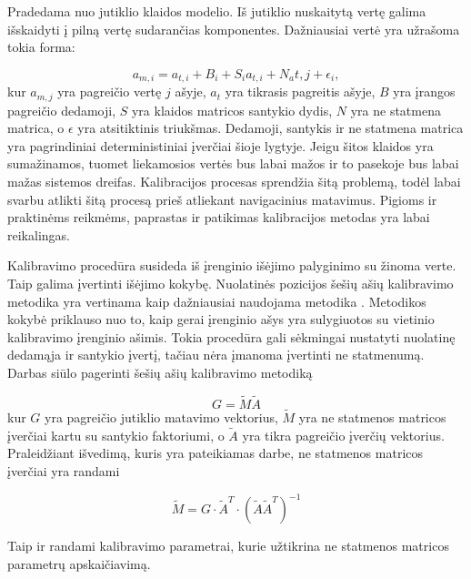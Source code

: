 Pradedama nuo jutiklio klaidos modelio. Iš jutiklio nuskaitytą vertę galima išskaidyti į pilną vertę sudarančias komponentes. Dažniausiai vertė yra užrašoma tokia forma:

\begin{equation}
    a_{m,i} = a_{t,i} + B_i + S_{i}a_{t,i} + N_a{t,j} + \epsilon_i,
\end{equation}
kur $a_{m,j}$ yra pagreičio vertę $j$ ašyje, $a_t$ yra tikrasis pagreitis ašyje, $B$ yra įrangos pagreičio dedamoji, $S$ yra klaidos matricos santykio dydis, $N$ yra ne statmena matrica, o $\epsilon$ yra atsitiktinis triukšmas. Dedamoji, santykis ir ne statmena matrica yra pagrindiniai deterministiniai įverčiai šioje lygtyje. Jeigu šitos klaidos yra sumažinamos, tuomet liekamosios vertės bus labai mažos ir to pasekoje bus labai mažas sistemos dreifas. Kalibracijos procesas sprendžia šitą problemą, todėl labai svarbu atlikti šitą procesą prieš atliekant navigacinius matavimus. Pigioms ir praktinėms reikmėms, paprastas ir patikimas kalibracijos metodas yra labai reikalingas.

Kalibravimo procedūra susideda iš įrenginio išėjimo palyginimo su žinoma verte. Taip galima įvertinti išėjimo kokybę. Nuolatinės pozicijos šešių ašių kalibravimo metodika yra vertinama kaip dažniausiai naudojama metodika \cite{syed2007new}. Metodikos kokybė priklauso nuo to, kaip gerai įrenginio ašys yra sulygiuotos su vietinio kalibravimo įrenginio ašimis. Tokia procedūra gali sėkmingai nustatyti nuolatinę dedamąja ir santykio įvertį, tačiau nėra įmanoma įvertinti ne statmenumą. Darbas siūlo pagerinti šešių ašių kalibravimo metodiką 

\begin{equation}
    G = \tilde{M} \tilde{A}
\end{equation}
kur $G$ yra pagreičio jutiklio matavimo vektorius, $\tilde{M}$ yra ne statmenos matricos įverčiai kartu su santykio faktoriumi, o $\tilde{A}$ yra tikra pagreičio įverčių vektorius. Praleidžiant išvedimą, kuris yra pateikiamas darbe, ne statmenos matricos įverčiai yra randami

\begin{equation}
    \tilde{M} = G \cdot \tilde{A}^T \cdot (\tilde{A}\tilde{A}^T)^{-1}
\end{equation}

Taip ir randami kalibravimo parametrai, kurie užtikrina ne statmenos matricos parametrų apskaičiavimą.




